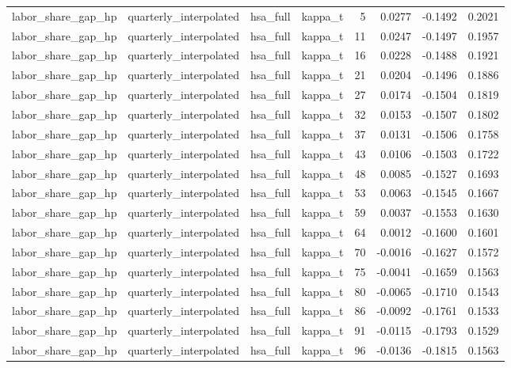 \begin{tabular}{llllrrrr}
labor\_share\_gap\_hp & quarterly\_interpolated & hsa\_full & kappa\_t & 5 & 0.0277 & -0.1492 & 0.2021 \\
labor\_share\_gap\_hp & quarterly\_interpolated & hsa\_full & kappa\_t & 11 & 0.0247 & -0.1497 & 0.1957 \\
labor\_share\_gap\_hp & quarterly\_interpolated & hsa\_full & kappa\_t & 16 & 0.0228 & -0.1488 & 0.1921 \\
labor\_share\_gap\_hp & quarterly\_interpolated & hsa\_full & kappa\_t & 21 & 0.0204 & -0.1496 & 0.1886 \\
labor\_share\_gap\_hp & quarterly\_interpolated & hsa\_full & kappa\_t & 27 & 0.0174 & -0.1504 & 0.1819 \\
labor\_share\_gap\_hp & quarterly\_interpolated & hsa\_full & kappa\_t & 32 & 0.0153 & -0.1507 & 0.1802 \\
labor\_share\_gap\_hp & quarterly\_interpolated & hsa\_full & kappa\_t & 37 & 0.0131 & -0.1506 & 0.1758 \\
labor\_share\_gap\_hp & quarterly\_interpolated & hsa\_full & kappa\_t & 43 & 0.0106 & -0.1503 & 0.1722 \\
labor\_share\_gap\_hp & quarterly\_interpolated & hsa\_full & kappa\_t & 48 & 0.0085 & -0.1527 & 0.1693 \\
labor\_share\_gap\_hp & quarterly\_interpolated & hsa\_full & kappa\_t & 53 & 0.0063 & -0.1545 & 0.1667 \\
labor\_share\_gap\_hp & quarterly\_interpolated & hsa\_full & kappa\_t & 59 & 0.0037 & -0.1553 & 0.1630 \\
labor\_share\_gap\_hp & quarterly\_interpolated & hsa\_full & kappa\_t & 64 & 0.0012 & -0.1600 & 0.1601 \\
labor\_share\_gap\_hp & quarterly\_interpolated & hsa\_full & kappa\_t & 70 & -0.0016 & -0.1627 & 0.1572 \\
labor\_share\_gap\_hp & quarterly\_interpolated & hsa\_full & kappa\_t & 75 & -0.0041 & -0.1659 & 0.1563 \\
labor\_share\_gap\_hp & quarterly\_interpolated & hsa\_full & kappa\_t & 80 & -0.0065 & -0.1710 & 0.1543 \\
labor\_share\_gap\_hp & quarterly\_interpolated & hsa\_full & kappa\_t & 86 & -0.0092 & -0.1761 & 0.1533 \\
labor\_share\_gap\_hp & quarterly\_interpolated & hsa\_full & kappa\_t & 91 & -0.0115 & -0.1793 & 0.1529 \\
labor\_share\_gap\_hp & quarterly\_interpolated & hsa\_full & kappa\_t & 96 & -0.0136 & -0.1815 & 0.1563 \\

\end{tabular}
